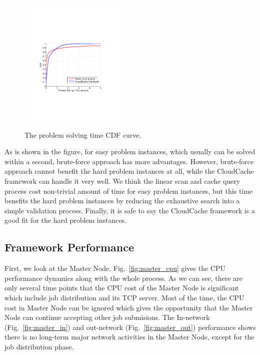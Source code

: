 \begin{figure}
\centering
\includegraphics[width=0.45\textwidth]{pics/time.pdf}
\caption{The problem solving time CDF curve.}
\label{fig:time}
\end{figure}

As is shown in the figure, for easy problem instances, which usually can be solved within a second, brute-force approach has more advantages. However, brute-force approach cannot benefit the hard problem instances at all, while the CloudCache framework can handle it very well. We think the linear scan and cache query process cost non-trivial amount of time for easy problem instances, but this time benefits the hard problem instances by reducing the exhaustive search into a simple validation process. Finally, it is safe to say the CloudCache framework is a good fit for the hard problem instances.

\subsection{Framework Performance}
First, we look at the Master Node. Fig.~\ref{fig:master_cpu} gives the CPU performance dynamics along with the whole process. As we can see, there are only several time points that the CPU cost of the Master Node is significant which include job distribution and its TCP server. Most of the time, the CPU cost in Master Node can be ignored which gives the opportunity that the Master Node can continue accepting other job submisions. The In-network (Fig.~\ref{fig:master_in}) and out-network (Fig.~\ref{fig:master_out}) performance shows there is no long-term major network activities in the Master Node, except for the job distribution phase.

